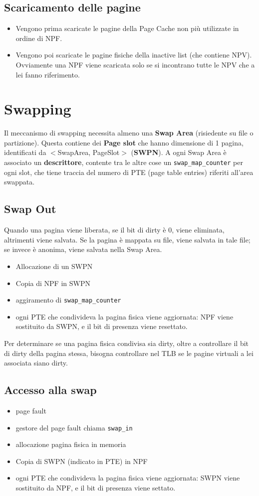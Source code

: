 \documentclass[12pt, a4paper]{report}
\begin{document}
\subsection{Scaricamento delle pagine}
\begin{itemize}
	\item Vengono prima scaricate le pagine della Page Cache non più utilizzate
		in ordine di NPF.
	\item Vengono poi scaricate le pagine fisiche della inactive list (che
		contiene NPV). Ovviamente una NPF viene scaricata solo se si incontrano
		tutte le NPV che a lei fanno riferimento.
\end{itemize}

\section{Swapping}
Il meccanismo di swapping necessita almeno una \textbf{Swap Area} (risiedente su
file o partizione). Questa contiene dei \textbf{Page slot} che hanno dimensione
di 1 pagina, identificati da $<$SwapArea, PageSlot$>$ (\textbf{SWPN}). A ogni
Swap Area è associato un \textbf{descrittore}, contente tra le altre cose un
\texttt{swap\_map\_counter} per ogni slot, che tiene traccia del numero di PTE
(page table entries) riferiti all'area swappata.
\subsection{Swap Out}
Quando una pagina viene liberata, se il bit di dirty è 0, viene eliminata,
altrimenti viene salvata. Se la pagina è mappata su file, viene salvata in tale
file; se invece è anonima, viene salvata nella Swap Area.
\begin{itemize}
	\item Allocazione di un SWPN
	\item Copia di NPF in SWPN
	\item aggiramento di \texttt{swap\_map\_counter}
	\item ogni PTE che condivideva la pagina fisica viene aggiornata:
		NPF viene sostituito da SWPN, e il bit di presenza viene
		resettato.
\end{itemize}
Per determinare se una pagina fisica condivisa sia dirty, oltre a controllare il
bit di dirty della pagina stessa, bisogna controllare nel TLB se le pagine
virtuali a lei associata siano dirty. %
\subsection{Accesso alla swap}
\begin{itemize}
	\item page fault
	\item gestore del page fault chiama \texttt{swap\_in}
	\item allocazione pagina fisica in memoria
	\item Copia di SWPN (indicato in PTE) in NPF
	\item ogni PTE che condivideva la pagina fisica viene aggiornata: SWPN viene
		sostituito da NPF, e il bit di presenza viene settato.
\end{itemize}
\end{document}
